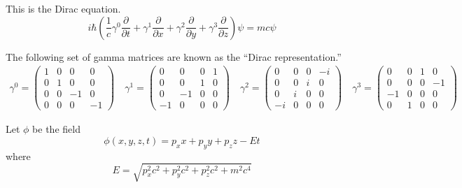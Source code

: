 \documentclass[12pt]{article}
\begin{document}
\noindent
This is the Dirac equation.
\begin{equation*}
i\hbar\left(\frac{1}{c}
\gamma^0\frac{\partial}{\partial t}+
\gamma^1\frac{\partial}{\partial x}+
\gamma^2\frac{\partial}{\partial y}+
\gamma^3\frac{\partial}{\partial z}
\right)\psi
=mc\psi
\end{equation*}

\noindent
The following set of gamma matrices are known as the ``Dirac representation.''
{\small
\begin{gather*}
\gamma^0=\begin{pmatrix}1&0&0&0\\0&1&0&0\\0&0&-1&0\\0&0&0&-1\end{pmatrix}\quad
\gamma^1=\begin{pmatrix}0&0&0&1\\0&0&1&0\\0&-1&0&0\\-1&0&0&0\end{pmatrix}\quad
\gamma^2=\begin{pmatrix}0&0&0&-i\\0&0&i&0\\0&i&0&0\\-i&0&0&0\end{pmatrix}\quad
\gamma^3=\begin{pmatrix}0&0&1&0\\0&0&0&-1\\-1&0&0&0\\0&1&0&0\end{pmatrix}
\end{gather*}
}

\noindent
Let $\phi$ be the field
\begin{equation*}
\phi(x,y,z,t)=p_xx+p_yy+p_zz-Et
\end{equation*}
where
\begin{equation*}
E=\sqrt{p_x^2c^2+p_y^2c^2+p_z^2c^2+m^2c^4}
\end{equation*}
\end{document}
